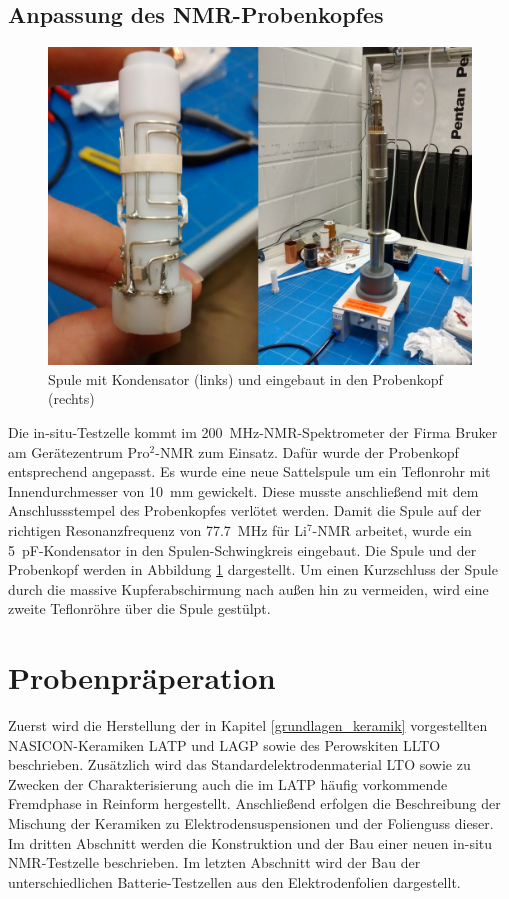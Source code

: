 \documentclass[a4paper, 11pt, headsepline,footsepline,twoside,abstract]{scrbook}
\begin{document}
\section{Anpassung des NMR-Probenkopfes}
\label{anpassung_probenkopf}
\begin{figure}
	\centering
	\includegraphics[width=0.85\columnwidth]{images/Platzhalter_Spule.jpg}
	\caption{Spule mit Kondensator (links) und eingebaut in den Probenkopf (rechts)}
	\label{spule}
\end{figure}
Die in-situ-Testzelle kommt im \SI{200}{\mega\hertz}-NMR-Spektrometer der Firma Bruker am Gerätezentrum Pro$^2$-NMR zum Einsatz. Dafür wurde der Probenkopf entsprechend angepasst. Es wurde eine neue Sattelspule um ein Teflonrohr mit Innendurchmesser von \SI{10}{\milli\metre} gewickelt. Diese musste anschließend mit dem Anschlussstempel des Probenkopfes verlötet werden. Damit die Spule auf der richtigen Resonanzfrequenz von \SI{77.7}{\mega\hertz} für Li$^7$-NMR arbeitet, wurde ein \SI{5}{\pico\farad}-Kondensator in den Spulen-Schwingkreis eingebaut. Die Spule und der Probenkopf werden in Abbildung \ref{spule} dargestellt. Um einen Kurzschluss der Spule durch die massive Kupferabschirmung nach außen hin zu vermeiden, wird eine zweite Teflonröhre über die Spule gestülpt.


\chapter{Probenpräperation}
Zuerst wird die Herstellung der in Kapitel \ref{grundlagen_keramik} vorgestellten NASICON-Keramiken LATP und LAGP sowie des Perowskiten LLTO beschrieben. Zusätzlich wird das Standardelektrodenmaterial LTO sowie zu Zwecken der Charakterisierung auch die im LATP häufig vorkommende Fremdphase  in Reinform hergestellt. Anschließend erfolgen die Beschreibung der Mischung der Keramiken zu Elektrodensuspensionen und der Folienguss dieser. Im dritten Abschnitt werden die Konstruktion und der Bau einer neuen in-situ NMR-Testzelle beschrieben. Im letzten Abschnitt wird der Bau der unterschiedlichen Batterie-Testzellen aus den Elektrodenfolien dargestellt. 
\end{document}
